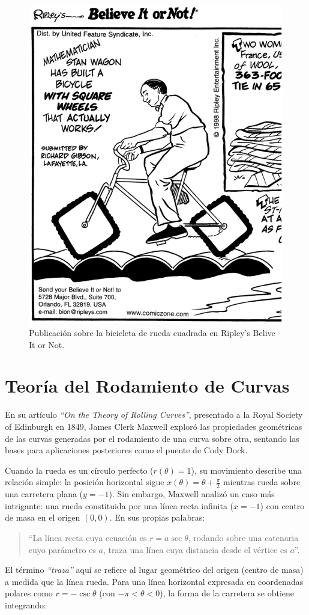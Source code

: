 \documentclass{IEEEtran}
\begin{document}
\begin{figure}[h]
    \centering
    \includegraphics[width = 0.5 \textwidth]{Imagenes/Square Wheel Tricycle.png}
    \caption{Publicación sobre la bicicleta de rueda cuadrada en Ripley's Belive It or Not.}
    \label{fig: Ripley's Belive It or Not}
\end{figure}

\section{Teoría del Rodamiento de Curvas}

En su artículo \textit{``On the Theory of Rolling Curves''}, presentado a la Royal Society of Edinburgh en 1849, James Clerk Maxwell exploró las propiedades geométricas de las curvas generadas por el rodamiento de una curva sobre otra, sentando las bases para aplicaciones posteriores como el puente de Cody Dock. 

Cuando la rueda es un círculo perfecto ($r(\theta) = 1$), su movimiento describe una relación simple: la posición horizontal sigue $x(\theta) = \theta + \frac{\pi}{2}$ mientras rueda sobre una carretera plana ($y = -1$). Sin embargo, Maxwell analizó un caso más intrigante: una rueda constituida por una línea recta infinita ($x = -1$) con centro de masa en el origen $(0,0)$. En sus propias palabras: 

\begin{quote}
``La línea recta cuya ecuación es $r = a \sec \theta$, rodando sobre una catenaria cuyo parámetro es $a$, traza una línea cuya distancia desde el vértice es $a$''.
\end{quote}

El término \textit{``traza''} aquí se refiere al lugar geométrico del origen (centro de masa) a medida que la línea rueda. Para una línea horizontal expresada en coordenadas polares como $r = -\csc \theta$ (con $-\pi < \theta < 0$), la forma de la carretera se obtiene integrando:
\end{document}
